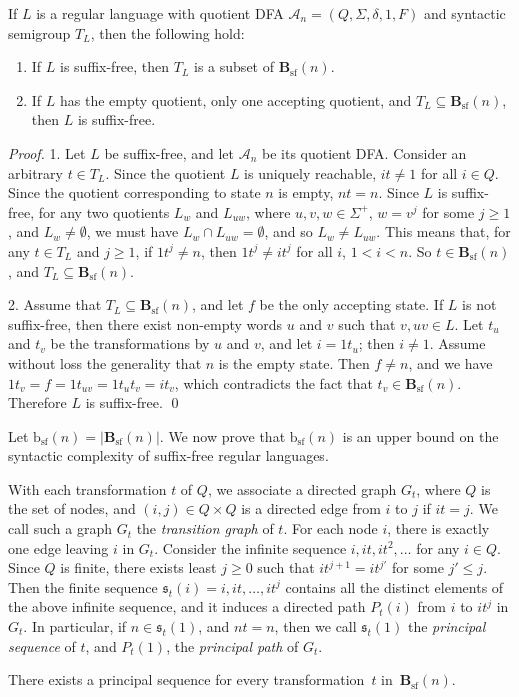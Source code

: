 \documentclass{llncs}
\renewcommand{\le}{\leqslant}
\renewcommand{\ge}{\geqslant}
\newcommand{\Sig}{\Sigma}
\newcommand{\be}{\begin{enumerate}}
\newcommand{\ee}{\end{enumerate}}
\newcommand{\cA}{{\mathcal A}}
\newcommand{\seq}{{\mathfrak{s}}}
\newcommand{\tpath}{P}
\newcommand{\Bsf}{\mathbf{B}_{\mathrm{sf}}}
\newcommand{\bsf}{{\mathrm{b}_{\mathrm{sf}}}}
\begin{document}
\begin{proposition}
\label{prop:sf}
If $L$ is a regular language with quotient DFA $\cA_n = (Q, \Sig, \delta, 1, F)$ and syntactic semigroup $T_L$, then the following hold:
\be
\item If $L$ is suffix-free, then $T_L$ is a subset of $\Bsf(n)$.
\item If $L$ has the empty quotient, only one accepting quotient, and $T_L \subseteq \Bsf(n)$, then $L$ is suffix-free.
\ee
\end{proposition}

\begin{proof}
1. Let $L$ be suffix-free, and let $\cA_n$ be its quotient DFA. 
Consider an arbitrary $t \in T_L$. Since the quotient $L$ is uniquely reachable, $it \neq 1$ for all $i \in Q$. Since the quotient corresponding to state $n$ is empty, $nt = n$. 
Since $L$ is suffix-free, for any two quotients $L_w$ and $L_{uw}$, where $u,v,w \in \Sig^+$, $w = v^j$ for some $j \ge 1$, and $L_w \neq \emptyset$, we must have $L_w \cap L_{uw} = \emptyset$, and so $L_w \neq L_{uw}$. 
This means that, for any $t \in T_L$ and $j \ge 1$, if $1t^j \neq n$, then $1t^j \neq it^j$ for all $i$, $1 < i < n$. So $t \in \Bsf(n)$, and $T_L \subseteq \Bsf(n)$.


2. Assume that $T_L \subseteq \Bsf(n)$, and let $f$ be the only accepting state. If $L$ is not suffix-free, then there exist non-empty words $u$ and $v$ such that $v, uv \in L$. Let $t_u$ and $t_v$ be the transformations by $u$ and $v$, and let $i = 1t_u$; then $i \neq 1$. 
Assume without loss the generality that $n$ is the empty state. Then $f\neq n$, and we have $1t_v = f = 1t_{uv} = 1t_ut_v = it_v$, which contradicts the fact that $t_v \in \Bsf(n)$. Therefore $L$ is suffix-free. \qed
\end{proof}

Let $\bsf(n) = |\Bsf(n)|$. We now prove that $\bsf(n)$ is an upper bound  on the syntactic complexity of suffix-free regular languages. 

With each transformation $t$ of $Q$, we associate a directed graph $G_t$, where $Q$ is the set of nodes, and $(i,j) \in Q \times Q$ is a directed edge from $i$ to $j$ if $it = j$. We call such a graph $G_t$ the {\em transition graph} of $t$. For each node $i$, there is exactly one edge leaving $i$ in $G_t$. Consider the infinite sequence $i,it,it^2,\ldots$ for any $i \in Q$. Since $Q$ is finite, there exists least $j \ge 0$ such that $it^{j+1} = it^{j'}$ for some $j' \le j$. Then the finite sequence $\seq_t(i) = i,it,\ldots,it^j$ contains all the distinct elements of the above infinite sequence, and it induces a directed path $\tpath_t(i)$ from $i$ to $it^j$ in $G_t$. In particular, if $n \in \seq_t(1)$, and $nt = n$, then we call $\seq_t(1)$ the {\em principal sequence} of $t$, and $\tpath_t(1)$, the {\em principal path} of $G_t$. 
\begin{proposition}\label{prop:ppsf} 
There exists a principal sequence for every transformation~$t$ in~$\Bsf(n)$. 
\end{proposition}
\end{document}
